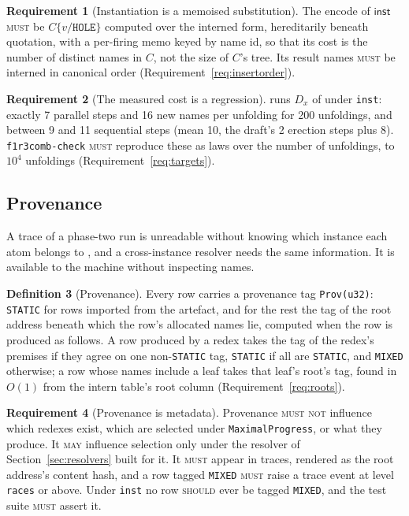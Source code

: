 \documentclass[11pt,a4paper]{article}
\newcommand{\code}[1]{\texttt{#1}}
\newcommand{\MUST}{\textsc{must}}
\newcommand{\MUSTNOT}{\textsc{must not}}
\newcommand{\SHOULD}{\textsc{should}}
\newcommand{\MAY}{\textsc{may}}
\theoremstyle{definition}
\newtheorem{definition}{Definition}[section]
\newtheorem{requirement}[definition]{Requirement}
\theoremstyle{plain}
\newcommand{\inst}{\mathsf{inst}}
\begin{document}
\begin{requirement}[Instantiation is a memoised substitution]\label{req:subst}
The encode of $\inst$ \MUST{} be $C\{v/\code{HOLE}\}$ computed over the
interned form, hereditarily beneath quotation, with a per-firing memo keyed
by name id, so that its cost is the number of distinct names in $C$, not the
size of $C$'s tree. Its result names \MUST{} be interned in canonical order
(Requirement~\ref{req:insertorder}).
\end{requirement}

\begin{requirement}[The measured cost is a regression]\label{req:dxlaw}
\cite[Find.~14.4]{matnote} runs $D_{x}$ of \cite[Ex.~6.9]{draft3} under
\code{inst}: exactly 7 parallel steps and 16 new names per unfolding for 200
unfoldings, and between 9 and 11 sequential steps (mean 10, the draft's 2
erection steps plus 8). \code{f1r3comb-check} \MUST{} reproduce these as laws
over the number of unfoldings, to $10^{4}$ unfoldings
(Requirement~\ref{req:targets}).
\end{requirement}

\subsection{Provenance}\label{sec:prov}

A trace of a phase-two run is unreadable without knowing which instance each
atom belongs to \cite[Req.~9.5]{combspec}, and a cross-instance resolver needs
the same information. It is available to the machine without inspecting
names.

\begin{definition}[Provenance]\label{def:prov}
Every row carries a provenance tag \code{Prov(u32)}: \code{STATIC} for rows
imported from the artefact, and for the rest the tag of the root address
beneath which the row's allocated names lie, computed when the row is
produced as follows. A row produced by a redex takes the tag of the redex's
premises if they agree on one non-\code{STATIC} tag, \code{STATIC} if all
are \code{STATIC}, and \code{MIXED} otherwise; a row whose names include a
leaf takes that leaf's root's tag, found in $O(1)$ from the intern table's
root column (Requirement~\ref{req:roots}).
\end{definition}

\begin{requirement}[Provenance is metadata]\label{req:provmeta}
Provenance \MUSTNOT{} influence which redexes exist, which are selected under
\code{MaximalProgress}, or what they produce. It \MAY{} influence selection
only under the resolver of Section~\ref{sec:resolvers} built for it. It
\MUST{} appear in traces, rendered as the root address's content hash, and a
row tagged \code{MIXED} \MUST{} raise a trace event at level \code{races} or
above. Under \code{inst} no row \SHOULD{} ever be tagged \code{MIXED}, and
the test suite \MUST{} assert it.
\end{requirement}
\end{document}
